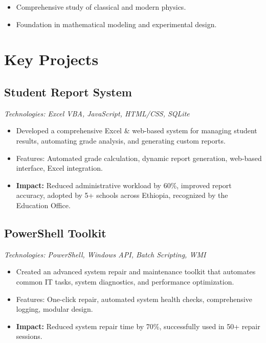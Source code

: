 \documentclass[11pt]{article}
\begin{document}
\begin{itemize}[leftmargin=1.5em, itemsep=0.2em]
    \item Comprehensive study of classical and modern physics.
    \item Foundation in mathematical modeling and experimental design.
\end{itemize}

\section{Key Projects}

\subsection{Student Report System}
\textit{Technologies: Excel VBA, JavaScript, HTML/CSS, SQLite}

\begin{itemize}[leftmargin=1.5em, itemsep=0.2em]
    \item Developed a comprehensive Excel \& web-based system for managing student results, automating grade analysis, and generating custom reports.
    \item Features: Automated grade calculation, dynamic report generation, web-based interface, Excel integration.
    \item \textbf{Impact:} Reduced administrative workload by 60\%, improved report accuracy, adopted by 5+ schools across Ethiopia, recognized by the Education Office.
\end{itemize}

\subsection{PowerShell Toolkit}
\textit{Technologies: PowerShell, Windows API, Batch Scripting, WMI}

\begin{itemize}[leftmargin=1.5em, itemsep=0.2em]
    \item Created an advanced system repair and maintenance toolkit that automates common IT tasks, system diagnostics, and performance optimization.
    \item Features: One-click repair, automated system health checks, comprehensive logging, modular design.
    \item \textbf{Impact:} Reduced system repair time by 70\%, successfully used in 50+ repair sessions.
\end{itemize}
\end{document}
